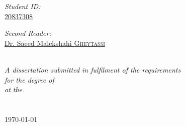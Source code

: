 \documentclass[
11pt, %
english, %
onehalfspacing, %
headsepline, %
]{MastersDoctoralThesis} %
\begin{document}
\begin{titlepage}
\begin{center}
\begin{minipage}[t]{0.4\textwidth}
	\begin{flushleft} \large
		\emph{Student ID:}\\
		\href{mailto:j.barclay3@uni.brighton.ac.uk}{20837308}\\
	\end{flushleft}
\end{minipage}
\begin{minipage}[t]{0.4\textwidth}
	\begin{flushright} \large
		\emph{Second Reader:} \\
		\href{https://www.researchgate.net/profile/Saeed-Malekshahi-Gheytassi}{Dr. Saeed Malekshahi \textsc{Gheytassi}}
	\end{flushright}
\end{minipage}\\[1.5cm]


\large \textit{A dissertation submitted in fulfilment of the requirements\\ for the degree of \degreename}\\[0.3cm] %
\textit{at the}\\[0.4cm]
\univname\\\deptname\\[1cm] %

{\large \today}\\[1cm] %

\end{center}
\end{titlepage}

\end{document}
